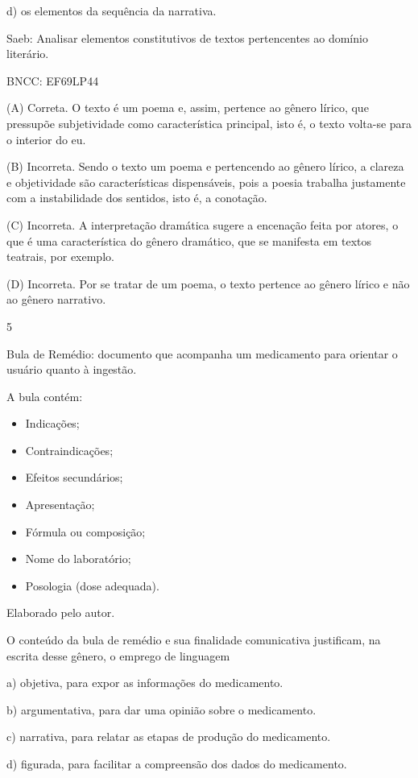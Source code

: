d) os elementos da sequência da narrativa.

Saeb: Analisar elementos constitutivos de textos pertencentes ao domínio
literário.

BNCC: EF69LP44

(A) Correta. O texto é um poema e, assim, pertence ao gênero lírico, que
pressupõe subjetividade como característica principal, isto é, o texto
volta-se para o interior do eu.

(B) Incorreta. Sendo o texto um poema e pertencendo ao gênero lírico, a
clareza e objetividade são características dispensáveis, pois a poesia
trabalha justamente com a instabilidade dos sentidos, isto é, a
conotação.

(C) Incorreta. A interpretação dramática sugere a encenação feita por
atores, o que é uma característica do gênero dramático, que se manifesta
em textos teatrais, por exemplo.

(D) Incorreta. Por se tratar de um poema, o texto pertence ao gênero
lírico e não ao gênero narrativo.

\num{5}

Bula de Remédio: documento que acompanha um medicamento para orientar o
usuário quanto à ingestão.

A bula contém:

\begin{itemize}
\item
  Indicações;
\item
  Contraindicações;
\item
  Efeitos secundários;
\item
  Apresentação;
\item
  Fórmula ou composição;
\item
  Nome do laboratório;
\item
  Posologia (dose adequada).
\end{itemize}

Elaborado pelo autor.

O conteúdo da bula de remédio e sua finalidade comunicativa justificam,
na escrita desse gênero, o emprego de linguagem

a) objetiva, para expor as informações do medicamento.

b) argumentativa, para dar uma opinião sobre o medicamento.

c) narrativa, para relatar as etapas de produção do medicamento.

d) figurada, para facilitar a compreensão dos dados do medicamento.

